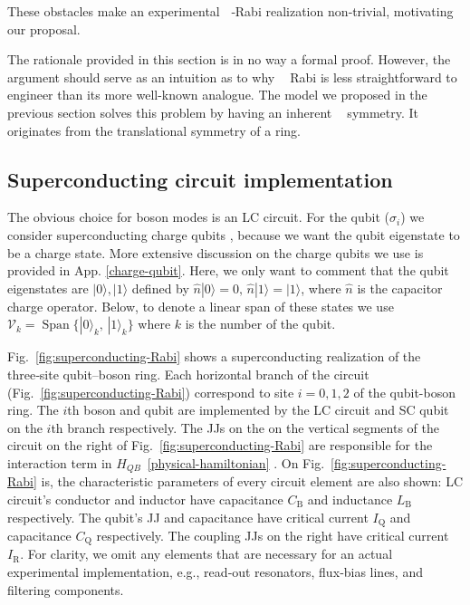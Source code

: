 \documentclass[reprint, aps, prx, amsmath, amssymb, longbibliography, superscriptaddress]{revtex4-2}
\DeclareMathOperator{\Zn}{\mathbb{Z}_n}
\DeclareMathOperator{\Zthree}{\mathbb{Z}_3}
\begin{document}
These obstacles make an experimental $\Zn$‑Rabi realization non‑trivial, motivating our proposal.

The rationale provided in this section is in no way a formal proof. However, the argument should serve as an intuition as to why $\Zthree$ Rabi is less straightforward to engineer than its more well-known analogue. The model we proposed in the previous section solves this problem by having an inherent $\Zthree$ symmetry. It originates from the translational symmetry of a ring.

\subsection{Superconducting circuit implementation}
\label{superconducting-implementation}


The obvious choice for boson modes is an LC circuit. For the qubit ($\sigma_i$)  we consider superconducting charge qubits \cite{bouchiat_quantum_1998,nakamura_coherent_1999,lehnert_measurement_2003,makhlin_quantumstate_2001}, because we want the qubit eigenstate to be a charge state. More extensive discussion on the charge qubits we use is provided in App. \ref{charge-qubit}. Here, we only want to comment that the qubit eigenstates are $|0\rangle, |1\rangle$ defined by $\hat n |0\rangle = 0, \, \hat n |1\rangle = |1\rangle$, where $\hat n$ is the capacitor charge operator. Below, to denote a linear span of these states we use $\mathcal{V}_k = \operatorname{Span}\{|0\rangle_k, \, |1\rangle_k\}$ where $k$ is the number of the qubit.

Fig.~\ref{fig:superconducting-Rabi} shows a superconducting realization of the three‑site qubit–boson ring. Each horizontal branch of the circuit (Fig.~\ref{fig:superconducting-Rabi}) correspond to site $i = 0,1,2$ of the qubit-boson ring. The $i$th boson and qubit are implemented by the LC circuit and SC qubit on the $i$th branch respectively. The JJs on the on the vertical segments of the circuit on the right of Fig.~\ref{fig:superconducting-Rabi} are responsible for the interaction term in $H_{QB}$~\eqref{physical-hamiltonian} \cite{siewert_aspects_2000,rasmussen_controllable_2019,shafranjuk_twoqubit_2006,allman_tunable_2014,hu_controllable_2007}. On Fig.~\ref{fig:superconducting-Rabi} is, the characteristic parameters of every circuit element are also shown: LC circuit's conductor and inductor have capacitance $C_{\text{B}}$ and inductance $L_{\text{B}}$ respectively. The qubit's JJ and capacitance have critical current $I_{\text{Q}}$ and capacitance $C_{\text{Q}}$ respectively. The coupling JJs on the right have critical current $I_{\text{R}}$. For clarity, we omit any elements that are necessary for an actual experimental implementation, e.g., read‑out resonators, flux‑bias lines, and filtering components.
\end{document}
